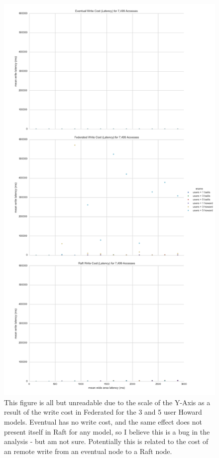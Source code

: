 \documentclass[10pt,letterpaper]{article}
\begin{document}
\begin{figure}[!h]
    \centering
        \includegraphics[height=0.9\textheight]{figures/write_latency.png}
        \caption{\textsf{This figure is all but unreadable due to the scale of the Y-Axis as a result of the write cost in Federated for the 3 and 5 user Howard models. Eventual has no write cost, and the same effect does not present itself in Raft for any model, so I believe this is a bug in the analysis - but am not sure. Potentially this is related to the cost of an remote write from an eventual node to a Raft node.}}
        \label{fig:write_latency}
\end{figure}
\end{document}
